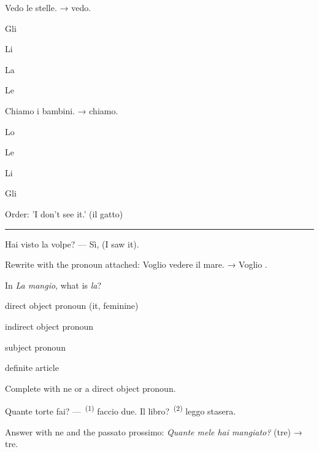 \documentclass[11pt,a4paper,twoside,openright]{book}
\newcommand{\blank}{\underline{\hspace{2.6cm}}}
\newcommand{\clozeblank}[1]{\underline{\hspace{2.4cm}}\textsuperscript{\,(#1)}}
\newcommand{\answerline}{\par\vspace{6pt}\noindent\rule{0.75\linewidth}{0.4pt}\par}
\newcommand{\token}[1]{\fbox{\strut\itshape #1}}
\begin{document}
\begin{exercises}
\item\label{ex:direct-object-pronouns-1}\relax Vedo le stelle. → \blank{} vedo.\par\nopagebreak\begin{options}
\item\relax Gli
\item\relax Li
\item\relax La
\item\relax Le
\end{options}
\item\label{ex:direct-object-pronouns-2}\relax Chiamo i bambini. → \blank{} chiamo.\par\nopagebreak\begin{options}
\item\relax Lo
\item\relax Le
\item\relax Li
\item\relax Gli
\end{options}
\item\label{ex:direct-object-pronouns-3}\relax Order: 'I don't see it.' (il gatto)\par\smallskip \token{lo} \token{Non} \token{vedo}\par\answerline
\item\label{ex:direct-object-pronouns-4}\relax Hai visto la volpe? — Sì, \blank{} (I saw it).
\item\label{ex:direct-object-pronouns-5}\relax Rewrite with the pronoun attached: Voglio vedere il mare. → Voglio \blank{}.
\item\label{ex:direct-object-pronouns-6}\relax In \textit{La mangio}, what is \textit{la}?\par\nopagebreak\begin{options}
\item\relax direct object pronoun (it, feminine)
\item\relax indirect object pronoun
\item\relax subject pronoun
\item\relax definite article
\end{options}
\item\label{ex:direct-object-pronouns-ne1}\relax Complete with ne or a direct object pronoun.\par\smallskip\begingroup\setlength{\parindent}{0pt}Quante torte fai? — \clozeblank{1} faccio due. Il libro? \clozeblank{2} leggo stasera.\par\endgroup
\item\label{ex:direct-object-pronouns-ne2}\relax Answer with ne and the passato prossimo: \textit{Quante mele hai mangiato?} (tre) → \blank{} tre.
\end{exercises}
\end{document}

